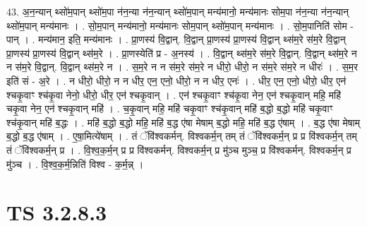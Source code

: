 \documentclass[17pt]{extarticle}
\begin{document}
43. अ॒न॒न्यान् थ्सो॑म॒पान् थ्सो॑म॒पा न॑न॒न्या न॑न॒न्यान् थ्सो॑म॒पान् मन्य॑मानो॒ मन्य॑मानः सोम॒पा न॑न॒न्या न॑न॒न्यान् थ्सो॑म॒पान् मन्य॑मानः । . सो॒म॒पान् मन्य॑मानो॒ मन्य॑मानः सोम॒पान् थ्सो॑म॒पान् मन्य॑मानः । . सो॒म॒पानिति॑ सोम - पान् । . मन्य॑मान॒ इति॒ मन्य॑मानः । . प्रा॒णस्य॑ वि॒द्वान्. वि॒द्वान् प्रा॒णस्य॑ प्रा॒णस्य॑ वि॒द्वान् थ्स॑म॒रे स॑म॒रे वि॒द्वान् प्रा॒णस्य॑ प्रा॒णस्य॑ वि॒द्वान् थ्स॑म॒रे । . प्रा॒णस्येति॑ प्र - अ॒नस्य॑ । . वि॒द्वान् थ्स॑म॒रे स॑म॒रे वि॒द्वान्. वि॒द्वान् थ्स॑म॒रे न न स॑म॒रे वि॒द्वान्. वि॒द्वान् थ्स॑म॒रे न । . स॒म॒रे न न स॑म॒रे स॑म॒रे न धीरो॒ धीरो॒ न स॑म॒रे स॑म॒रे न धीरः॑ । . स॒म॒र इति॑ सं - अ॒रे । . न धीरो॒ धीरो॒ न न धीर॒ एन॒ एनो॒ धीरो॒ न न धीर॒ एनः॑ । . धीर॒ एन॒ एनो॒ धीरो॒ धीर॒ एन॑ श्चकृ॒वाꣳ श्च॑कृ॒वा नेनो॒ धीरो॒ धीर॒ एन॑ श्चकृ॒वान् । . एन॑ श्चकृ॒वाꣳ श्च॑कृ॒वा नेन॒ एन॑ श्चकृ॒वान् महि॒ महि॑ चकृ॒वा नेन॒ एन॑ श्चकृ॒वान् महि॑ । . च॒कृ॒वान् महि॒ महि॑ चकृ॒वाꣳ श्च॑कृ॒वान् महि॑ ब॒द्धो ब॒द्धो महि॑ चकृ॒वाꣳ श्च॑कृ॒वान् महि॑ ब॒द्धः । . महि॑ ब॒द्धो ब॒द्धो महि॒ महि॑ ब॒द्ध ए॑षा मेषाम् ब॒द्धो महि॒ महि॑ ब॒द्ध ए॑षाम् । . ब॒द्ध ए॑षा मेषाम् ब॒द्धो ब॒द्ध ए॑षाम् । . ए॒षा॒मित्ये॑षाम् । . तं ॅवि॑श्वकर्मन्. विश्वकर्म॒न् तम् तं ॅवि॑श्वकर्म॒न् प्र प्र वि॑श्वकर्म॒न् तम् तं ॅवि॑श्वकर्म॒न् प्र । . वि॒श्व॒क॒र्म॒न् प्र प्र वि॑श्वकर्मन्. विश्वकर्म॒न् प्र मु॑ञ्च मुञ्च॒ प्र वि॑श्वकर्मन्. विश्वकर्म॒न् प्र मु॑ञ्च । . वि॒श्व॒क॒र्म॒न्निति॑ विश्व - क॒र्म॒न्न् । \newline
\pagebreak
{}

\section{ TS 3.2.8.3 }
\end{document}
